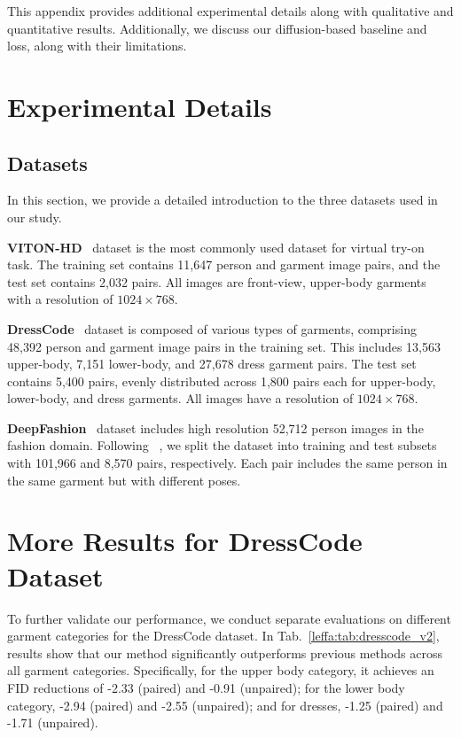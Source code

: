 This appendix provides additional experimental details along with qualitative and quantitative results.
Additionally, we discuss our diffusion-based baseline and \leffa{} loss, along with their limitations.

\section{Experimental Details}

\subsection{Datasets}
In this section, we provide a detailed introduction to the three datasets used in our study.

\noindent \textbf{VITON-HD}~\citep{choi2021viton} dataset is the most commonly used dataset for virtual try-on task.
The training set contains 11,647 person and garment image pairs, and the test set contains 2,032 pairs.
All images are front-view, upper-body garments with a resolution of $1024 \times 768$.

\noindent \textbf{DressCode}~\citep{morelli2022dress} dataset is composed of various types of garments, comprising 48,392 person and garment image pairs in the training set.
This includes 13,563 upper-body, 7,151 lower-body, and 27,678 dress garment pairs.
The test set contains 5,400 pairs, evenly distributed across 1,800 pairs each for upper-body, lower-body, and dress garments.
All images have a resolution of $1024 \times 768$.

\noindent \textbf{DeepFashion}~\citep{liu2016deepfashion} dataset includes high resolution 52,712 person images in the fashion domain.
Following ~\citet{zhu2019progressive}, we split the dataset into training and test subsets with 101,966 and 8,570 pairs, respectively.
Each pair includes the same person in the same garment but with different poses.


\section{More Results for DressCode Dataset}

To further validate our performance, we conduct separate evaluations on different garment categories for the DressCode dataset.
In Tab.~\ref{leffa:tab:dresscode_v2}, results show that our method significantly outperforms previous methods across all garment categories.
Specifically, for the upper body category, it achieves an FID reductions of -2.33 (paired) and -0.91 (unpaired); for the lower body category, -2.94 (paired) and -2.55 (unpaired); and for dresses, -1.25 (paired) and -1.71 (unpaired).

